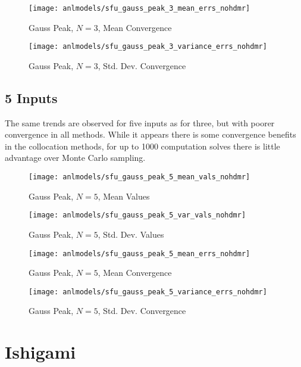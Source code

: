 \begin{figure}[H]
  \centering
  \texttt{[image: anlmodels/sfu\_gauss\_peak\_3\_mean\_errs\_nohdmr]}
  \caption{Gauss Peak, $N=3$, Mean Convergence}
  \label{fig:gauss peak mean errors 3}
\end{figure}
\begin{figure}[H]
  \centering
  \texttt{[image: anlmodels/sfu\_gauss\_peak\_3\_variance\_errs\_nohdmr]}
  \caption{Gauss Peak, $N=3$, Std. Dev. Convergence}
  \label{fig:gauss peak var errors 3}
\end{figure}

\subsection{5 Inputs}
The same trends are observed for five inputs as for three, but with poorer convergence in all methods.  While
it appears there is some convergence benefits in the collocation methods, for up to 1000 computation solves
there is little advantage over Monte Carlo sampling.
\begin{figure}[H]
  \centering
  \texttt{[image: anlmodels/sfu\_gauss\_peak\_5\_mean\_vals\_nohdmr]}
  \caption{Gauss Peak, $N=5$, Mean Values}
  \label{fig:gauss peak mean values 5}
\end{figure}
\begin{figure}[H]
  \centering
  \texttt{[image: anlmodels/sfu\_gauss\_peak\_5\_var\_vals\_nohdmr]}
  \caption{Gauss Peak, $N=5$, Std. Dev. Values}
  \label{fig:gauss peak var values 5}
\end{figure}

\begin{figure}[H]
  \centering
  \texttt{[image: anlmodels/sfu\_gauss\_peak\_5\_mean\_errs\_nohdmr]}
  \caption{Gauss Peak, $N=5$, Mean Convergence}
  \label{fig:gauss peak mean errors 5}
\end{figure}
\begin{figure}[H]
  \centering
  \texttt{[image: anlmodels/sfu\_gauss\_peak\_5\_variance\_errs\_nohdmr]}
  \caption{Gauss Peak, $N=5$, Std. Dev. Convergence}
  \label{fig:gauss peak var errors 5}
\end{figure}




\section{Ishigami}
